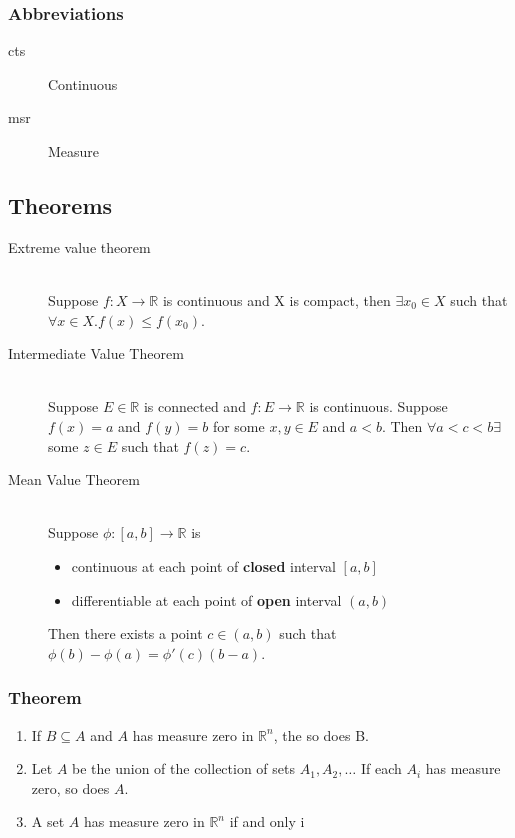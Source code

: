 \subsubsection{Abbreviations}
\begin{description}
  \item[cts] Continuous
  \item[msr] Measure
\end{description}



\subsection{Theorems}
\begin{description}
\item[Extreme value theorem]\label{thm:evt}\hfill\\
	Suppose $f:X \to \mathbb{R}$ is continuous and X is compact, \newline
	then $\exists x_0 \in X$ such that $\forall x \in X. f(x) \leq f(x_0)$.
\item[Intermediate Value Theorem]\label{thm:ivt}\hfill\\
	Suppose $E \in \mathbb{R}$ is connected and $f: E \to \mathbb{R}$ is continuous. \newline
	Suppose $f(x) = a$ and $f(y) = b$ for some $x, y \in E$ and $a < b$. \newline
	Then $\forall a < c < b \exists$ some $z \in E$ such that $f(z) = c$.
\item[Mean Value Theorem]\label{thm:mvt}\hfill\\
	Suppose $\phi:[a,b]\to\mathbb{R}$ is
	\begin{itemize}
		\item continuous at each point of \textbf{closed} interval $[a, b]$
		\item differentiable at each point of \textbf{open} interval $(a, b)$
	\end{itemize}
	Then there exists a point $c \in (a,b)$ such that $\phi(b)-\phi(a) = \phi'(c)(b-a)$.
\end{description}


\subsubsection{Theorem }

\begin{enumerate}
  \item If $B \subseteq A$ and $A$ has measure zero in $\mathbb{R}^n$, the so does B.
  \item Let $A$ be the union of the collection of sets
        $A_1, A_2, \ldots$ If each $A_i$ has measure zero, so does $A$.
  \item A set $A$ has measure zero in $\mathbb{R}^n$ if and only i
\end{enumerate}